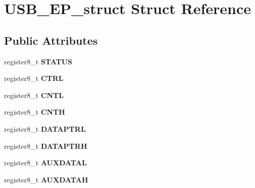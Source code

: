 \hypertarget{struct_u_s_b___e_p__struct}{}\section{U\+S\+B\+\_\+\+E\+P\+\_\+struct Struct Reference}
\label{struct_u_s_b___e_p__struct}
\subsection*{Public Attributes}
\begin{DoxyCompactItemize}
\item 
register8\+\_\+t {\bfseries S\+T\+A\+T\+US}\hypertarget{struct_u_s_b___e_p__struct_a650d648e1e4aded0225cc0577752f55d}{}\label{struct_u_s_b___e_p__struct_a650d648e1e4aded0225cc0577752f55d}

\item 
register8\+\_\+t {\bfseries C\+T\+RL}\hypertarget{struct_u_s_b___e_p__struct_a1778ae238eacc7110c7d22e227cb9023}{}\label{struct_u_s_b___e_p__struct_a1778ae238eacc7110c7d22e227cb9023}

\item 
register8\+\_\+t {\bfseries C\+N\+TL}\hypertarget{struct_u_s_b___e_p__struct_ab5489a52cb134edbe9da60e322d40923}{}\label{struct_u_s_b___e_p__struct_ab5489a52cb134edbe9da60e322d40923}

\item 
register8\+\_\+t {\bfseries C\+N\+TH}\hypertarget{struct_u_s_b___e_p__struct_a32667f57f4dd0c15bbabeb02c3a96fd8}{}\label{struct_u_s_b___e_p__struct_a32667f57f4dd0c15bbabeb02c3a96fd8}

\item 
register8\+\_\+t {\bfseries D\+A\+T\+A\+P\+T\+RL}\hypertarget{struct_u_s_b___e_p__struct_ab1db1f557daa7bec1d7b062782295321}{}\label{struct_u_s_b___e_p__struct_ab1db1f557daa7bec1d7b062782295321}

\item 
register8\+\_\+t {\bfseries D\+A\+T\+A\+P\+T\+RH}\hypertarget{struct_u_s_b___e_p__struct_a4df5611cca67452ba21d068f003b78c1}{}\label{struct_u_s_b___e_p__struct_a4df5611cca67452ba21d068f003b78c1}

\item 
register8\+\_\+t {\bfseries A\+U\+X\+D\+A\+T\+AL}\hypertarget{struct_u_s_b___e_p__struct_a9d9cb4f17e735b15f4c12ebedb29642c}{}\label{struct_u_s_b___e_p__struct_a9d9cb4f17e735b15f4c12ebedb29642c}

\item 
register8\+\_\+t {\bfseries A\+U\+X\+D\+A\+T\+AH}\hypertarget{struct_u_s_b___e_p__struct_aa6d33e9045138bb324caf24285f3e706}{}\label{struct_u_s_b___e_p__struct_aa6d33e9045138bb324caf24285f3e706}

\end{DoxyCompactItemize}


